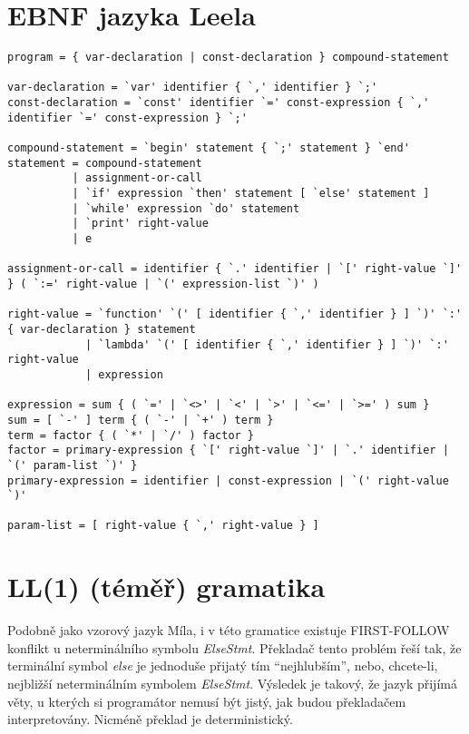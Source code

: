 \documentclass[10pt,a4paper]{article}
\begin{document}
\section{EBNF jazyka Leela}
\label{sec:ebnf}

\begin{lstlisting}[identifierstyle=\textbf]
program = { var-declaration | const-declaration } compound-statement

var-declaration = `var' identifier { `,' identifier } `;'
const-declaration = `const' identifier `=' const-expression { `,' identifier `=' const-expression } `;'

compound-statement = `begin' statement { `;' statement } `end'
statement = compound-statement
          | assignment-or-call
          | `if' expression `then' statement [ `else' statement ]
          | `while' expression `do' statement
          | `print' right-value
          | e

assignment-or-call = identifier { `.' identifier | `[' right-value `]' } ( `:=' right-value | `(' expression-list `)' )

right-value = `function' `(' [ identifier { `,' identifier } ] `)' `:' { var-declaration } statement
            | `lambda' `(' [ identifier { `,' identifier } ] `)' `:' right-value
            | expression

expression = sum { ( `=' | `<>' | `<' | `>' | `<=' | `>=' ) sum }
sum = [ `-' ] term { ( `-' | `+' ) term }
term = factor { ( `*' | `/' ) factor }
factor = primary-expression { `[' right-value `]' | `.' identifier | `(' param-list `)' }
primary-expression = identifier | const-expression | `(' right-value `)'

param-list = [ right-value { `,' right-value } ]

\end{lstlisting}

\section{LL(1) (téměř) gramatika}

Podobně jako vzorový jazyk Míla, i v této gramatice existuje FIRST-FOLLOW
konflikt u neterminálního symbolu \textit{ElseStmt}. Překladač tento problém
řeší tak, že terminální symbol \textit{else} je jednoduše přijatý tím
``nejhlubším'', nebo, chcete-li, nejbližší neterminálním symbolem
\textit{ElseStmt}. Výsledek je takový, že jazyk přijímá věty, u kterých si
programátor nemusí být jistý, jak budou překladačem interpretovány. Nicméně
překlad je deterministický.
\end{document}
